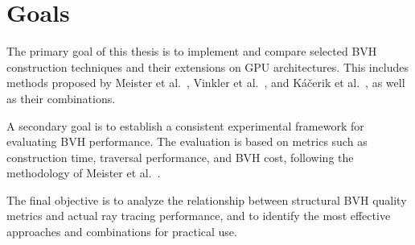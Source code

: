 \section{Goals}

The primary goal of this thesis is to implement and compare selected BVH construction techniques and their extensions on GPU architectures. This includes methods proposed by Meister et al.~\cite{MB17}, Vinkler et al.~\cite{Vinkler2017}, and Káčerik et al.~\cite{KB25}, as well as their combinations.

A secondary goal is to establish a consistent experimental framework for evaluating BVH performance. The evaluation is based on metrics such as construction time, traversal performance, and BVH cost, following the methodology of Meister et al.~\cite{MB22}.

The final objective is to analyze the relationship between structural BVH quality metrics and actual ray tracing performance, and to identify the most effective approaches and combinations for practical use.
